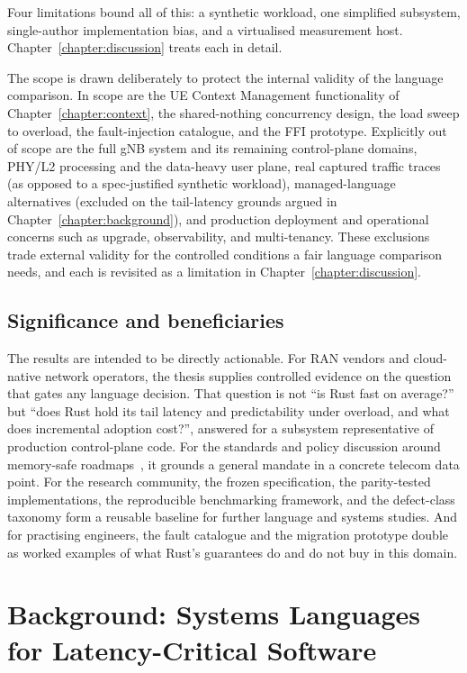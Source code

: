 \documentclass[english,oneside,a4paper,censored,csm,software-track-2020]{HYthesisML}
\begin{document}
Four limitations bound all of this: a synthetic workload, one simplified subsystem,
single-author implementation bias, and a virtualised measurement host.
Chapter~\ref{chapter:discussion} treats each in detail.

The scope is drawn deliberately to protect the internal validity of the language comparison. In
scope are the UE Context Management functionality of Chapter~\ref{chapter:context}, the
shared-nothing concurrency design, the load sweep to overload, the fault-injection catalogue,
and the FFI prototype. Explicitly out of scope are the full gNB system and its remaining
control-plane domains, PHY/L2 processing and the data-heavy user plane, real captured traffic
traces (as opposed to a spec-justified synthetic workload), managed-language alternatives
(excluded on the tail-latency grounds argued in Chapter~\ref{chapter:background}), and
production deployment and operational concerns such as upgrade, observability, and
multi-tenancy. These exclusions trade external validity for the controlled conditions a fair
language comparison needs, and each is revisited as a limitation in
Chapter~\ref{chapter:discussion}.

\section{Significance and beneficiaries}
The results are intended to be directly actionable. For RAN vendors and cloud-native network
operators, the thesis supplies controlled evidence on the question that gates any language
decision. That question is not ``is Rust fast on average?'' but ``does Rust hold its tail latency and
predictability under overload, and what does incremental adoption cost?'', answered for a subsystem
representative of production control-plane code. For the standards and policy discussion around
memory-safe roadmaps~\cite{cisa2023memorysafe,oncd2024building}, it grounds a general mandate in
a concrete telecom data point. For the research community, the frozen specification, the
parity-tested implementations, the reproducible benchmarking framework, and the defect-class
taxonomy form a reusable baseline for further language and systems studies. And for practising
engineers, the fault catalogue and the migration prototype double as worked examples of what
Rust's guarantees do and do not buy in this domain.

\chapter{Background: Systems Languages for Latency-Critical Software\label{chapter:background}}
\end{document}
